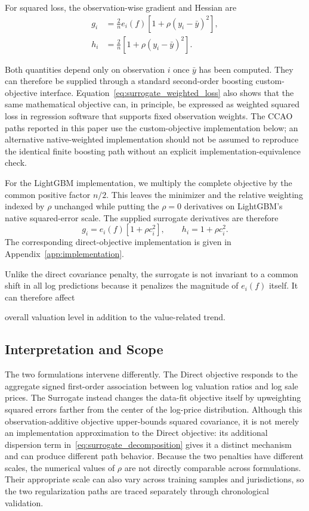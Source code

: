 \documentclass[10pt]{article}
\theoremstyle{definition}
\newcommand{\1}{\mathbf{1}}
\begin{document}
For squared loss, the observation-wise gradient and Hessian are
\begin{align}
\label{eq:surrogate_derivatives}
g_i
&=
\frac{2}{n}e_i(f)
\left[1+\rho(y_i-\bar y)^2\right],
\\
h_i
&=
\frac{2}{n}
\left[1+\rho(y_i-\bar y)^2\right].
\end{align}

Both quantities depend only on observation $i$ once $\bar y$ has been computed. They can therefore be supplied through a standard second-order boosting custom-objective interface. Equation~\eqref{eq:surrogate_weighted_loss} also shows that the same mathematical objective can, in principle, be expressed as weighted squared loss in regression software that supports fixed observation weights. The CCAO paths reported in this paper use the custom-objective implementation below; an alternative native-weighted implementation should not be assumed to reproduce the identical finite boosting path without an explicit implementation-equivalence check.


{For the LightGBM implementation, we multiply the complete objective by the common positive factor $n/2$. This leaves the minimizer and the relative weighting indexed by $\rho$ unchanged while putting the $\rho=0$ derivatives on LightGBM's native squared-error scale. The supplied surrogate derivatives are therefore
\[
g_i=e_i(f)\left[1+\rho c_i^2\right],
\qquad
h_i=1+\rho c_i^2.
\]
The corresponding direct-objective implementation is given in Appendix~\ref{app:implementation}.}


{Unlike the direct covariance penalty, the surrogate is not invariant to a common shift in all log predictions because it penalizes the magnitude of $e_i(f)$ itself. It can therefore affect

overall valuation level in addition to the value-related trend.
}


\subsection{Interpretation and Scope}
\label{subsec:correction_scope}


{

The two formulations intervene differently. The Direct objective responds to the aggregate signed first-order association between log valuation ratios and log sale prices. The Surrogate instead changes the data-fit objective itself by upweighting squared errors farther from the center of the log-price distribution. Although this observation-additive objective upper-bounds squared covariance, it is not merely an implementation approximation to the Direct objective: its additional dispersion term in~\eqref{eq:surrogate_decomposition} gives it a distinct mechanism and can produce different path behavior. Because the two penalties have different scales, the numerical values of $\rho$ are not directly comparable across formulations. Their appropriate scale can also vary across training samples and jurisdictions, so the two regularization paths are traced separately through chronological validation.}
\end{document}
